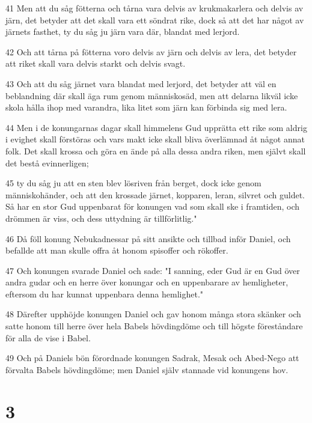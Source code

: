 \par 41 Men att du såg fötterna och tårna vara delvis av krukmakarlera och delvis av järn, det betyder att det skall vara ett söndrat rike, dock så att det har något av järnets fasthet, ty du såg ju järn vara där, blandat med lerjord.
\par 42 Och att tårna på fötterna voro delvis av järn och delvis av lera, det betyder att riket skall vara delvis starkt och delvis svagt.
\par 43 Och att du såg järnet vara blandat med lerjord, det betyder att väl en beblandning där skall äga rum genom människosäd, men att delarna likväl icke skola hålla ihop med varandra, lika litet som järn kan förbinda sig med lera.
\par 44 Men i de konungarnas dagar skall himmelens Gud upprätta ett rike som aldrig i evighet skall förstöras och vars makt icke skall bliva överlämnad åt något annat folk. Det skall krossa och göra en ände på alla dessa andra riken, men självt skall det bestå evinnerligen;
\par 45 ty du såg ju att en sten blev lösriven från berget, dock icke genom människohänder, och att den krossade järnet, kopparen, leran, silvret och guldet. Så har en stor Gud uppenbarat för konungen vad som skall ske i framtiden, och drömmen är viss, och dess uttydning är tillförlitlig."
\par 46 Då föll konung Nebukadnessar på sitt ansikte och tillbad inför Daniel, och befallde att man skulle offra åt honom spisoffer och rökoffer.
\par 47 Och konungen svarade Daniel och sade: "I sanning, eder Gud är en Gud över andra gudar och en herre över konungar och en uppenbarare av hemligheter, eftersom du har kunnat uppenbara denna hemlighet."
\par 48 Därefter upphöjde konungen Daniel och gav honom många stora skänker och satte honom till herre över hela Babels hövdingdöme och till högste föreståndare för alla de vise i Babel.
\par 49 Och på Daniels bön förordnade konungen Sadrak, Mesak och Abed-Nego att förvalta Babels hövdingdöme; men Daniel själv stannade vid konungens hov.

\chapter{3}

